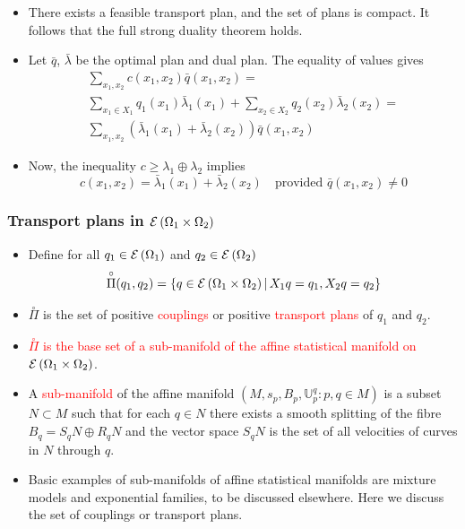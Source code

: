 \documentclass[xcolor=svgnames]{beamer}
\newcommand{\eBspace}[1]{B_{#1}}
\newcommand{\rosso}[1]{\textcolor{red}{#1}}
\renewcommand{\emph}{\rosso}
\renewcommand{\transport}[2]{{\mathbb U} _ {#1} ^ {#2}}
\begin{document}
\begin{frame}
\begin{itemize}
    \item There exists a feasible transport plan, and the set of plans is compact. It follows that the full strong duality theorem holds.
    \item Let $\bar q$, $\bar \lambda$ be the optimal plan and dual plan. The equality of values gives
    \begin{multline*}
    \sum_{x_1,x_2} c(x_1,x_2)\bar q(x_1,x_2) = \\ \sum_{x_1\in X_1}q_1(x_1) \bar \lambda_1(x_1) + \sum_{x_2 \in X_2} q_2(x_2) \bar \lambda_2(x_2) = \\
    \sum_{x_1,x_2} \left(\bar \lambda_1(x_1) + \bar \lambda_2(x_2)\right) \bar q(x_1,x_2) 
    \end{multline*}
    \item Now, the inequality $c \geq \lambda_1 \oplus \lambda _2$ implies
    \begin{equation*}
        c(x_1,x_2)=\bar \lambda_1(x_1) + \bar \lambda_2(x_2) \quad \text{provided $\bar q(x_1,x_2) \neq 0$}
    \end{equation*}
\end{itemize}
    
\end{frame}

\begin{frame}[plain]\small\frametitle{Transport plans in $\operatorname{\mathcal E}\left(\Omega_1 \times \Omega_2\right)$}
 \begin{itemize}
 
     \item Define for all $q_1 \in \operatorname{\mathcal E}\left(\Omega_1\right)$ and $q_2 \in \operatorname{\mathcal E}\left(\Omega_2\right)$
     \begin{equation*}
         \overset{\circ}{\Pi}(q_1,q_2) = \left\{q \in \operatorname{\mathcal E}\left(\Omega_1 \times \Omega_2\right) \, \middle| \, X_1 q = q_1,X_2 q= q_2 \right\}
     \end{equation*}
 
 \item  $\overset{\circ}{\Pi}$ is the set of positive \emph{couplings} or positive \emph{transport plans} of $q_1$ and $q_2$. 
 \item \emph{$\overset{\circ}{\Pi}$ is the base set of a sub-manifold of the affine statistical manifold on $\operatorname{\mathcal E}\left(\Omega_1 \times \Omega_2\right)$}.

\item A \emph{sub-manifold} of the affine manifold $(M,s_p,\eBspace p,\transport p q \colon p,q \in M)$ is a subset $N \subset M$ such that for each $q \in N$ there exists a smooth splitting of the fibre $\eBspace q = S_q N \oplus R_q N$ and the vector space $S_q N$ is the set of all velocities of curves in $N$ through $q$. 

\item Basic examples of sub-manifolds of affine statistical manifolds are mixture models and exponential families, to be discussed elsewhere. Here we discuss the set of couplings or transport plans.
 \end{itemize}
\end{frame}
\end{document}
